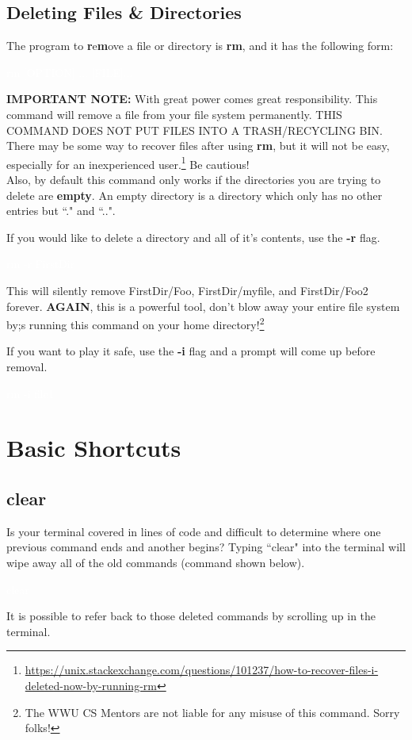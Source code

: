 \documentclass[oneside]{book}
\newcommand{\commandline}[1]{\begin{center} \colorbox{Dark}{\textcolor{white}{#1}} \end{center}}
\begin{document}
\subsection{Deleting Files \& Directories}
The program to \textbf{r}e\textbf{m}ove a file or directory is \textbf{rm}, and it has the following form:
\commandline{rm [OPTION] ... [FILE]...}

\textbf{IMPORTANT NOTE:} With great power comes great responsibility. This command will remove a file from your file system permanently. THIS COMMAND DOES NOT PUT FILES INTO A TRASH/RECYCLING BIN. There may be some way to recover files after using \textbf{rm}, but it will not be easy, especially for an inexperienced user.\footnote{\url{https://unix.stackexchange.com/questions/101237/how-to-recover-files-i-deleted-now-by-running-rm}} Be cautious! \\

Also, by default this command only works if the directories you are trying to delete are \textbf{empty}. An empty directory is a directory which only has no other entries but ``." and ``..".

If you would like to delete a directory and all of it's contents, use the \textbf{-r} flag.\\
\commandline{rm -r FirstDir} 

This will silently remove FirstDir/Foo, FirstDir/myfile, and FirstDir/Foo2 forever. \textbf{AGAIN}, this is a powerful tool, don't blow away your entire file system by;s  running this command on your home directory!\footnote{The WWU CS Mentors are not liable for any misuse of this command. Sorry folks!} 

If you want to play it safe, use the \textbf{-i} flag and a prompt will come up before removal.\ 
\commandline{rm -i file1}

\section{Basic Shortcuts}

\subsection{clear}
Is your terminal covered in lines of code and difficult to determine where one previous command ends and another begins? Typing ``clear" into the terminal will wipe away all of the old commands (command shown below).
\commandline{clear}
It is possible to refer back to those deleted commands by scrolling up in the terminal.
\end{document}
